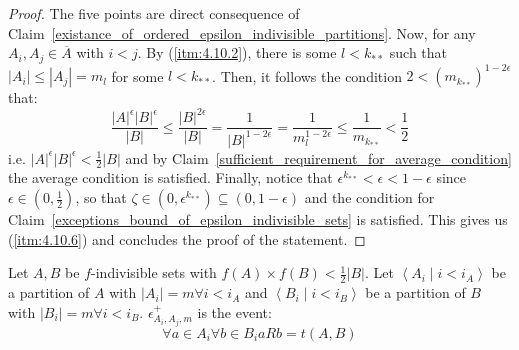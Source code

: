        \begin{proof}
            The five points are direct consequence of Claim~\ref{existance_of_ordered_epsilon_indivisible_partitions}.
            Now, for any $A_i, A_j \in \overline{A}$ with $i < j$.
            By (\ref{itm:4.10.2}), there is some $l < k_{**}$ such that $|A_i| \leq |A_j| = m_l$ for some $l < k_{**}$.
            Then, it follows the condition $2 < (m_{k_{**}})^{1-2\epsilon}$ that:
            \[
                \frac{|A|^\epsilon |B|^\epsilon}{|B|}
                    \leq \frac{|B|^{2\epsilon}}{|B|}
                    = \frac{1}{|B|^{1-2\epsilon}}
                    = \frac{1}{m_l^{1-2\epsilon}}
                    \leq \frac{1}{m_{k_{**}}}
                    < \frac{1}{2}
            \]
            i.e. $|A|^\epsilon |B|^\epsilon < \frac{1}{2} |B|$ and by Claim~\ref{sufficient_requirement_for_average_condition}
                the average condition is satisfied.
            Finally, notice that $\epsilon^{k_{**}} < \epsilon < 1 - \epsilon$ since $\epsilon \in (0, \frac{1}{2})$,
                so that $\zeta \in (0, \epsilon ^ {k_{**}}) \subseteq (0, 1 - \epsilon)$ and the condition for
                Claim~\ref{exceptions_bound_of_epsilon_indivisible_sets} is satisfied.
            This gives us (\ref{itm:4.10.6}) and concludes the proof of the statement.
        \end{proof}

    Let $A, B$ be $f$-indivisible sets with $f(A) \times f(B) < \frac{1}{2} |B|$.
    Let $\left< A_i \mid i < i_A \right>$ be a partition of $A$ with $|A_i| = m \forall i<i_A$ and
        $\left< B_i \mid i < i_B \right>$ be a partition of $B$ with $|B_i| = m \forall i<i_B$.
    $\epsilon^+_{A_i,A_j,m}$ is the event:
    \[
        \forall a \in A_i \forall b \in B_i a R b = t(A,B)
    \]


